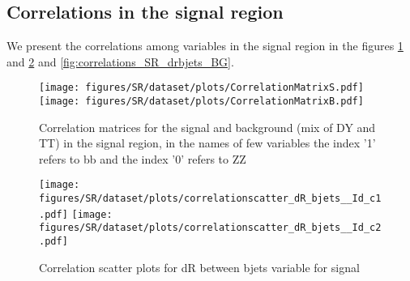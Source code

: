 \subsection{Correlations in the signal region}
We present the correlations among variables in the signal region in
the figures \ref{fig:corrMatrix_SR} and
\ref{fig:correlations_SR_drbjets_S} and \ref{fig:correlations_SR_drbjets_BG}.

\begin{figure}[!htb]%
\centering

\texttt{[image: figures/SR/dataset/plots/CorrelationMatrixS.pdf]}
\bigbreak
\texttt{[image: figures/SR/dataset/plots/CorrelationMatrixB.pdf]}
\caption{ Correlation matrices for the signal and background (mix of DY and TT) in the signal region, in the names of few variables the index '1' refers to bb and the index '0' refers to ZZ}
\label{fig:corrMatrix_SR}                                                       
\end{figure}





\begin{figure}[!htb]%
\centering
\texttt{[image: figures/SR/dataset/plots/correlationscatter\_dR\_bjets\_\_Id\_c1.pdf]}
\texttt{[image: figures/SR/dataset/plots/correlationscatter\_dR\_bjets\_\_Id\_c2.pdf]}
\caption{ Correlation scatter plots for dR between bjets variable for signal}%
\label{fig:correlations_SR_drbjets_S}                                                       
\end{figure}



